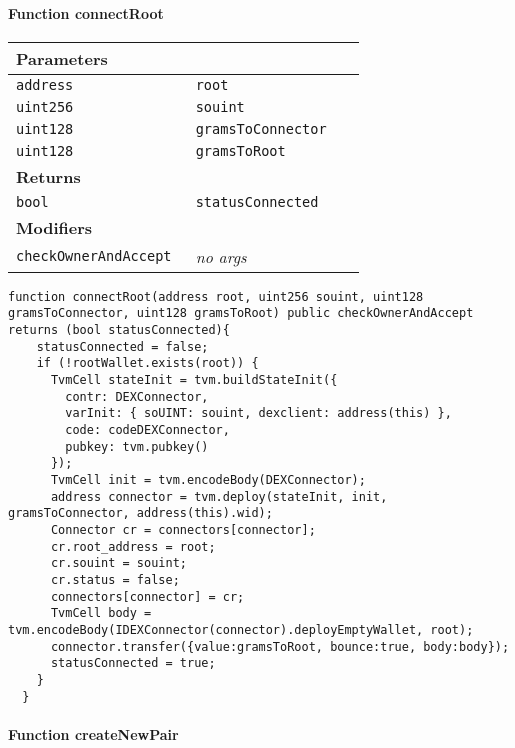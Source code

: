 \paragraph{Function connectRoot}


\ifsoltables
\noindent\begin{tabular}{|l|l|p{5cm}|}\hline
\multicolumn{3}{|l|}{\bf Parameters}\\\hline
\tt address & \tt root &\\\hline
\tt uint256 & \tt souint &\\\hline
\tt uint128 & \tt gramsToConnector &\\\hline
\tt uint128 & \tt gramsToRoot &\\\hline
\multicolumn{3}{|l|}{\bf Returns}\\\hline
\tt bool & \tt statusConnected &\\\hline
\multicolumn{3}{|l|}{\bf Modifiers}\\\hline
\tt checkOwnerAndAccept & {\em no args} &\\\hline
\end{tabular}
\fi

\vspace{2cm}

\begin{lstlisting}[firstnumber=158]
  function connectRoot(address root, uint256 souint, uint128 gramsToConnector, uint128 gramsToRoot) public checkOwnerAndAccept returns (bool statusConnected){
    statusConnected = false;
    if (!rootWallet.exists(root)) {
      TvmCell stateInit = tvm.buildStateInit({
        contr: DEXConnector,
        varInit: { soUINT: souint, dexclient: address(this) },
        code: codeDEXConnector,
        pubkey: tvm.pubkey()
      });
      TvmCell init = tvm.encodeBody(DEXConnector);
      address connector = tvm.deploy(stateInit, init, gramsToConnector, address(this).wid);
      Connector cr = connectors[connector];
      cr.root_address = root;
      cr.souint = souint;
      cr.status = false;
      connectors[connector] = cr;
      TvmCell body = tvm.encodeBody(IDEXConnector(connector).deployEmptyWallet, root);
      connector.transfer({value:gramsToRoot, bounce:true, body:body});
      statusConnected = true;
    }
  }
\end{lstlisting}

\paragraph{Function createNewPair}



